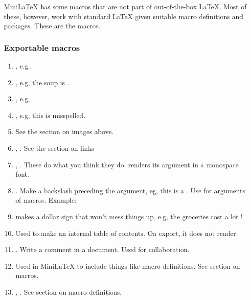 MiniLaTeX has some macros that are not part of out-of-the-box LaTeX. Most of these, however, work with standard LaTeX given suitable macro definitions and packages. These are the  macros.

\subsubsection{Exportable macros}

\begin{enumerate}

\item {}, e.g., 

\item {}, e.g, the soup is .

\item {}, e.g, 

\item {}, e.g, this is  misspelled.

\item {} See the section on images above.

\item {},  : See the section on links

\item  {},  .  These do what you think they do.    renders its argument in a monospace font.

\item  {}.  Make a backslash preceding the argument, eg, this is a .  Use  for arguments of macros. Example: 

\item  {} makes a dollar sign that won't mess things up, e.g, the groceries cost  a lot \dollar\dollar!

\item {} Used to make an internal table of contents.  On export, it does not render.

\item {}.  Write a comment in a document. Used for collaboration.

\item {} Used in MiniLaTeX to include things like macro definitions.  See section on macros.

\item {}, . See section on macro definitions.


\end{enumerate}

